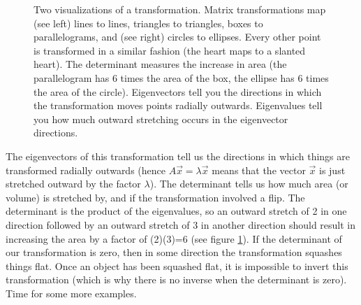 \begin{figure}
\caption{{
Two visualizations of a transformation. 
	Matrix transformations map (see left) lines to lines, triangles to triangles, boxes to parallelograms, and (see right) circles to ellipses.		
	Every other point is transformed in a similar fashion (the heart maps to a slanted heart). 
	The determinant measures the increase in area (the parallelogram has 6 times the area of the box, the ellipse has 6 times the area of the circle).	
	Eigenvectors tell you the directions in which the transformation moves points radially outwards. 
	Eigenvalues tell you how much outward stretching occurs in the eigenvector directions. 
}}
\label{matrix transformation example}
\end{figure}

The eigenvectors of this transformation tell us the directions in which things are transformed radially outwards 
(hence $A\vec x = \lambda \vec x$ means that the vector $\vec x$ is just stretched outward by the factor $\lambda$).  
The determinant tells us how much area (or volume) is stretched by, and if the transformation involved a flip. 
The determinant is the product of the eigenvalues, so an outward stretch of 2 in one direction followed by an outward stretch of 3 in another direction should result in increasing the area by a factor of (2)(3)=6 (see figure \ref{matrix transformation example}). 
If the determinant of our transformation is zero, then in some direction the transformation squashes things flat.
Once an object has been squashed flat, it is impossible to invert this transformation (which is why there is no inverse when the determinant is zero). 
Time for some more examples.



